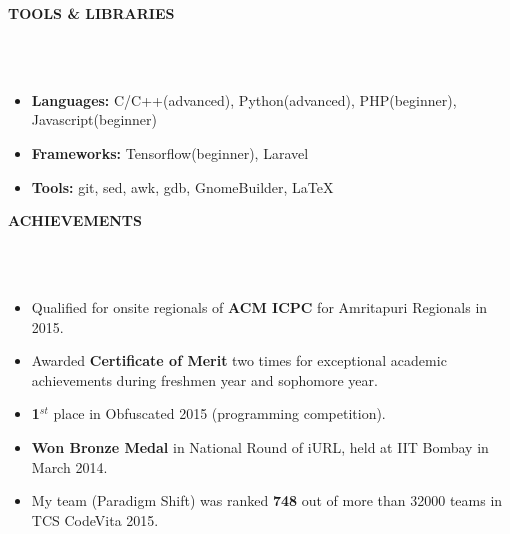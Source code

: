 \documentclass[a4paper,10pt]{article}
\newcommand{\lsep}{-0.5cm}
\newcommand{\resheading}[1]{{\small \colorbox{mygrey}{\begin{minipage}{0.975\textwidth}{\textbf{#1 \vphantom{p\^{E}}}}\end{minipage} \hspace{0.2cm}}}}
\begin{document}
\resheading{\textbf{TOOLS \& LIBRARIES}}\\[\lsep]
\\
\begin{itemize}
 \item \textbf{Languages: } C/C++(advanced), Python(advanced), PHP(beginner), Javascript(beginner)
 \item \textbf{Frameworks: } Tensorflow(beginner), Laravel
 \item \textbf{Tools: } git, sed, awk, gdb, GnomeBuilder, \LaTeX

\end{itemize}

\resheading{\textbf{ACHIEVEMENTS}}\\[\lsep]
\\
\begin{itemize}
 \item Qualified for onsite regionals of \textbf{ACM ICPC} for Amritapuri Regionals in 2015.
 \item Awarded \textbf{Certificate of Merit} two times for exceptional academic achievements during freshmen year and sophomore year.
 \item \textbf{1}$^{st}$ place in Obfuscated 2015 (programming competition).
 \item \textbf{Won Bronze Medal} in National Round of iURL, held at IIT Bombay in March 2014.
 \item My team (Paradigm Shift) was ranked \textbf{748} out of more than 32000 teams in TCS CodeVita 2015.

\end{itemize}
\end{document}

